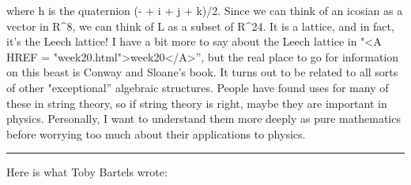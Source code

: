 where h is the quaternion (- + i + j + k)/2.  Since we can
think of an icosian as a vector in R^{8}, we can think of L as
a subset of R^{24}.  It is a lattice, and in fact, it's the
Leech lattice!  I have a bit more to say about the Leech lattice in
"<A HREF = "week20.html">week20</A>'', but the real place to go for
information on this beast is Conway and Sloane's book.  It turns out
to be related to all sorts of other "exceptional'' algebraic
structures.  People have found uses for many of these in string
theory, so if string theory is right, maybe they are important in
physics.  Personally, I want to understand them more deeply as pure
mathematics before worrying too much about their applications to
physics.

\par\noindent\rule{\textwidth}{0.4pt}
Here is what Toby Bartels wrote:



